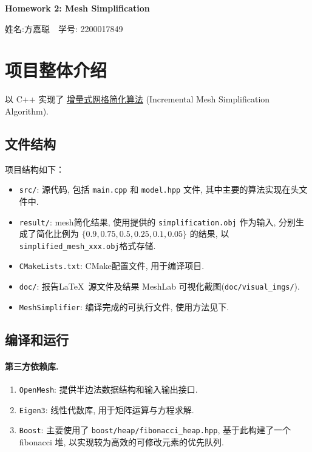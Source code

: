 \documentclass[11pt]{article}
\newcommand\1{\mathds{1}}
\begin{document}
\pagestyle{fancy}
\chead{}
\fancyfoot[R]{} 
\fancyfoot[C]{\thepage\ /\ \pageref{LastPage} \\ \textcolor{lightgray}{最后编译时间: \today}}


\begin{center}
    {\LARGE \bf Homework 2: Mesh Simplification} 

    {\kaishu 姓名:方嘉聪\ \  学号: 2200017849}            %
\end{center}
\section{项目整体介绍}
以 C++ 实现了 \underline{增量式网格简化算法} \cite{QEM} (Incremental Mesh Simplification Algorithm). 
\subsection{文件结构}
项目结构如下：
\begin{itemize}
    \item \texttt{src/}: 源代码, 包括 \texttt{main.cpp} 和 \texttt{model.hpp} 文件, 其中主要的算法实现在头文件中.
    \item \texttt{result/}: mesh简化结果, 使用提供的 \texttt{simplification.obj} 作为输入, 分别生成了简化比例为 $\{0.9, 0.75, 0.5, 0.25, 0.1, 0.05\}$ 的结果, 以\texttt{simplified\_mesh\_xxx.obj}格式存储.
    \item \texttt{CMakeLists.txt}: CMake配置文件, 用于编译项目.
    \item \texttt{doc/}: 报告\LaTeX\ 源文件及结果 MeshLab 可视化截图(\texttt{doc/visual\_imgs/}).
    \item \texttt{MeshSimplifier}: 编译完成的可执行文件, 使用方法见下.
\end{itemize}
\subsection{编译和运行}
\paragraph{第三方依赖库.} 
\begin{enumerate}
    \item \texttt{OpenMesh}: 提供半边法数据结构和输入输出接口.
    \item \texttt{Eigen3}: 线性代数库, 用于矩阵运算与方程求解.
    \item \texttt{Boost}: 主要使用了 \texttt{boost/heap/fibonacci\_heap.hpp}, 基于此构建了一个 fibonacci 堆, 以实现较为高效的可修改元素的优先队列.
\end{enumerate}
\end{document}
